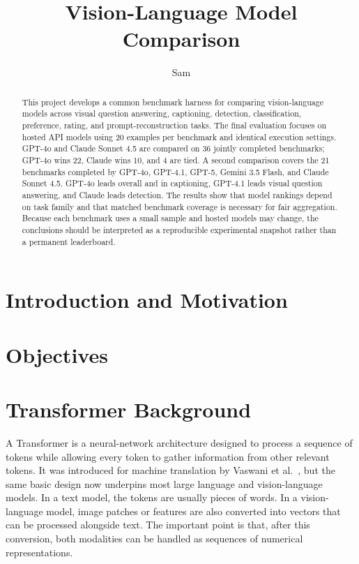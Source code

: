 ﻿\documentclass[11pt,a4paper]{article}
\title{\textbf{Vision-Language Model Comparison}}
\author{Sam}
\date{}
\begin{document}
\maketitle

\begin{abstract}
This project develops a common benchmark harness for comparing
vision-language models across visual question answering, captioning,
detection, classification, preference, rating, and prompt-reconstruction
tasks. The final evaluation focuses on hosted API models using 20 examples
per benchmark and identical execution settings. GPT-4o and Claude Sonnet 4.5
are compared on 36 jointly completed benchmarks; GPT-4o wins 22, Claude wins
10, and 4 are tied. A second comparison covers the 21 benchmarks completed
by GPT-4o, GPT-4.1, GPT-5, Gemini 3.5 Flash, and Claude Sonnet 4.5. GPT-4o
leads overall and in captioning, GPT-4.1 leads visual question answering,
and Claude leads detection. The results show that model rankings depend on
task family and that matched benchmark coverage is necessary for fair
aggregation. Because each benchmark uses a small sample and hosted models
may change, the conclusions should be interpreted as a reproducible
experimental snapshot rather than a permanent leaderboard.
\end{abstract}

\tableofcontents
\clearpage

\section{Introduction and Motivation}

\section{Objectives}

\section{Transformer Background}

A Transformer is a neural-network architecture designed to process a sequence
of tokens while allowing every token to gather information from other relevant
tokens. It was introduced for machine translation by
Vaswani et al.~\cite{vaswani2017attention}, but the same basic design now
underpins most large language and vision-language models. In a text model, the
tokens are usually pieces of words. In a vision-language model, image patches
or features are also converted into vectors that can be processed alongside
text. The important point is that, after this conversion, both modalities can
be handled as sequences of numerical representations.
\end{document}
